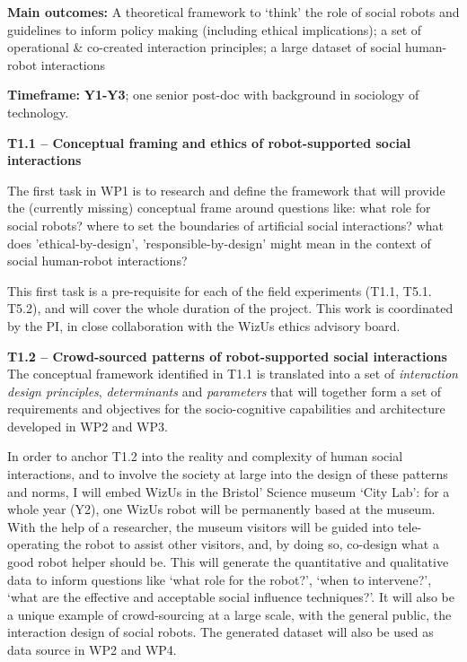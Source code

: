 \documentclass[11pt,a4paper]{report}
\newcommand{\project}{WizUs\xspace}
\begin{document}
\begin{framed}
    \textbf{Main outcomes:} A theoretical framework to `think' the role of
    social robots and guidelines to inform policy making (including ethical
    implications); a set of operational \& co-created interaction principles; a
    large dataset of social human-robot interactions

    \textbf{Timeframe:} \textbf{Y1-Y3}; one senior post-doc
with background in sociology of technology.
\end{framed}


\textbf{T1.1 -- Conceptual framing and ethics of robot-supported social
interactions}


The first task in WP1 is to research and define the framework that will provide
the (currently missing) conceptual frame around questions like: what role for
social robots? where to set the boundaries of artificial social interactions?
what does 'ethical-by-design', 'responsible-by-design' might mean in the context
of social human-robot interactions? 


This first task is a pre-requisite for each of the field experiments (T1.1,
T5.1. T5.2), and will cover the whole duration of the project. This work is
coordinated by the PI, in close collaboration with the \project ethics advisory
board.


\textbf{T1.2 -- Crowd-sourced patterns of robot-supported social
interactions} The conceptual framework identified in T1.1 is translated
into a set of \emph{interaction design principles}, \emph{determinants} and
\emph{parameters} that will together form a set of requirements and objectives
for the socio-cognitive capabilities and architecture developed in WP2 and WP3.

In order to anchor T1.2 into the reality and complexity of human social
interactions, and to involve the society at large into the design of these
patterns and norms, I will embed \project in the Bristol' Science museum `City
Lab': for a whole year (Y2), one \project robot will be permanently based at the
museum. With the help of a researcher, the museum visitors will be guided into
tele-operating the robot to assist other visitors, and, by doing so, co-design
what a good robot helper should be. This will generate the quantitative and
qualitative data to inform questions like `what role for the robot?', `when to
intervene?', `what are the effective and acceptable social influence
techniques?'. It will also be a unique example of crowd-sourcing at a large
scale, with the general public, the interaction design of social robots.  The
generated dataset will also be used as data source in WP2 and WP4.
\end{document}
